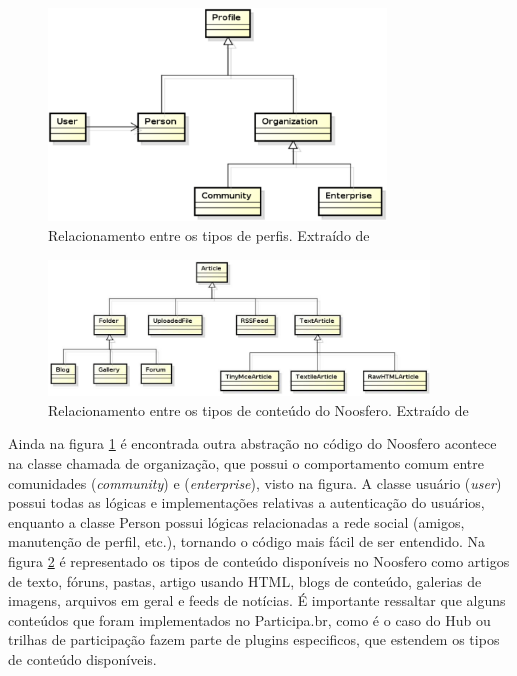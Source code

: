 \graphicspath{{figuras/}}
\begin{figure}[H]
	\centering
	\includegraphics[width=0.8\textwidth]{dominio-profile}
	\caption[Relacionamento entre os tipos de perfis]{Relacionamento entre os tipos de perfis. Extraído de \cite{bucher2013rede}}
	\label{fig:reltipoperfil}
\end{figure}

\graphicspath{{figuras/}}
\begin{figure}[H]
	\centering
	\includegraphics[width=0.9\textwidth]{dominio-artigo}
	\caption[Relacionamento entre os tipos de conteúdo do Noosfero]{Relacionamento entre os tipos de conteúdo do Noosfero. Extraído de \cite{bucher2013rede}}
	\label{fig:tipoconteudo}
\end{figure}

Ainda na figura \ref{fig:reltipoperfil} é encontrada outra abstração no código do Noosfero acontece na classe chamada de organização, que possui o comportamento comum entre comunidades (\textit{community}) e (\textit{enterprise}), visto na figura. A classe usuário (\textit{user}) possui todas as lógicas e implementações relativas a autenticação do usuários, enquanto a classe Person possui lógicas relacionadas a rede social (amigos, manutenção de perfil, etc.), tornando o código mais fácil de ser entendido. Na figura \ref{fig:tipoconteudo} é representado os tipos de conteúdo disponíveis no Noosfero como artigos de texto, fóruns, pastas, artigo usando HTML, blogs de conteúdo, galerias de imagens, arquivos em geral e feeds de notícias. É importante ressaltar que alguns conteúdos que foram implementados no Participa.br, como é o caso do Hub ou trilhas de participação fazem parte de plugins especificos, que estendem os tipos de conteúdo disponíveis.

